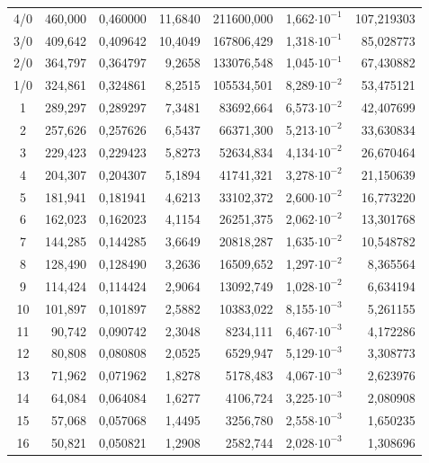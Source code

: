 \begin{longtable}{crrrrrr}
 4/0  &    460,000 &   0,460000 &    11,6840 & 211600,000 &  1,662$\cdot 10^{-1}$ & 107,219303 \\
 3/0  &    409,642 &   0,409642 &    10,4049 & 167806,429 &  1,318$\cdot 10^{-1}$ &  85,028773 \\
 2/0  &    364,797 &   0,364797 &     9,2658 & 133076,548 &  1,045$\cdot 10^{-1}$ &  67,430882 \\
 1/0  &    324,861 &   0,324861 &     8,2515 & 105534,501 &  8,289$\cdot 10^{-2}$ &  53,475121 \\
 1 &    289,297 &   0,289297 &     7,3481 &  83692,664 &  6,573$\cdot 10^{-2}$ &  42,407699 \\
 2 &    257,626 &   0,257626 &     6,5437 &  66371,300 &  5,213$\cdot 10^{-2}$ &  33,630834 \\
 3 &    229,423 &   0,229423 &     5,8273 &  52634,834 &  4,134$\cdot 10^{-2}$ &  26,670464 \\
 4 &    204,307 &   0,204307 &     5,1894 &  41741,321 &  3,278$\cdot 10^{-2}$ &  21,150639 \\
 5 &    181,941 &   0,181941 &     4,6213 &  33102,372 &  2,600$\cdot 10^{-2}$ &  16,773220 \\
 6 &    162,023 &   0,162023 &     4,1154 &  26251,375 &  2,062$\cdot 10^{-2}$ &  13,301768 \\
 7 &    144,285 &   0,144285 &     3,6649 &  20818,287 &  1,635$\cdot 10^{-2}$ &  10,548782 \\
 8 &    128,490 &   0,128490 &     3,2636 &  16509,652 &  1,297$\cdot 10^{-2}$ &   8,365564 \\
 9 &    114,424 &   0,114424 &     2,9064 &  13092,749 &  1,028$\cdot 10^{-2}$ &   6,634194 \\
10 &    101,897 &   0,101897 &     2,5882 &  10383,022 &  8,155$\cdot 10^{-3}$ &   5,261155 \\
11 &     90,742 &   0,090742 &     2,3048 &   8234,111 &  6,467$\cdot 10^{-3}$ &   4,172286 \\
12 &     80,808 &   0,080808 &     2,0525 &   6529,947 &  5,129$\cdot 10^{-3}$ &   3,308773 \\
13 &     71,962 &   0,071962 &     1,8278 &   5178,483 &  4,067$\cdot 10^{-3}$ &   2,623976 \\
14 &     64,084 &   0,064084 &     1,6277 &   4106,724 &  3,225$\cdot 10^{-3}$ &   2,080908 \\
15 &     57,068 &   0,057068 &     1,4495 &   3256,780 &  2,558$\cdot 10^{-3}$ &   1,650235 \\
16 &     50,821 &   0,050821 &     1,2908 &   2582,744 &  2,028$\cdot 10^{-3}$ &   1,308696 \\

\end{longtable}
